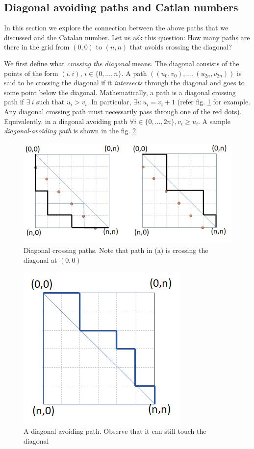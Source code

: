 
\subsection{Diagonal avoiding paths and Catlan numbers}
In this section we explore the connection  between the above paths that we discussed and the Catalan number. 
Let us ask this question:
How many paths are there in the grid from $(0,0)$ to $(n,n)$ that avoids crossing the diagonal? 

We first define what \textit{crossing the diagonal} means. The diagonal consists of the points of the form $(i,i)$, $i\in\{0,\ldots, n\}$. A path $((u_0,v_0), \ldots, (u_{2n},v_{2n}))$ is said to be crossing the diagonal if it \textit{intersects} through the diagonal and goes to some point below the diagonal. Mathematically, a path is a diagonal crossing path if $\exists~i$ such that $u_i>v_i$. In particular, $\exists i: u_i = v_i+1$ (refer fig. \ref{fig:diagonal-crossing-path} for example. Any diagonal crossing path must necessarily pass through one of the red dots). Equivalently, in a diagonal avoiding path $\forall i\in\{0,\ldots, 2n\}, v_i\ge u_i$. A sample \emph{diagonal-avoiding path} is shown in the fig. \ref{fig:diagonal-avoiding-path} %
\begin{figure}[h!]
    \centering
    \includegraphics[width=0.7\linewidth]{diagonal-crossing.jpeg}
    \caption{Diagonal crossing paths. Note that path in (a) is crossing the diagonal at $(0,0)$}
    \label{fig:diagonal-crossing-path}
\end{figure}

\begin{figure}[h!]
    \centering
    \includegraphics[width=0.4\linewidth]{diagonal-avoiding-path.png}
    \caption{A diagonal avoiding path. Observe that it can still touch the diagonal}
    \label{fig:diagonal-avoiding-path}
\end{figure}

